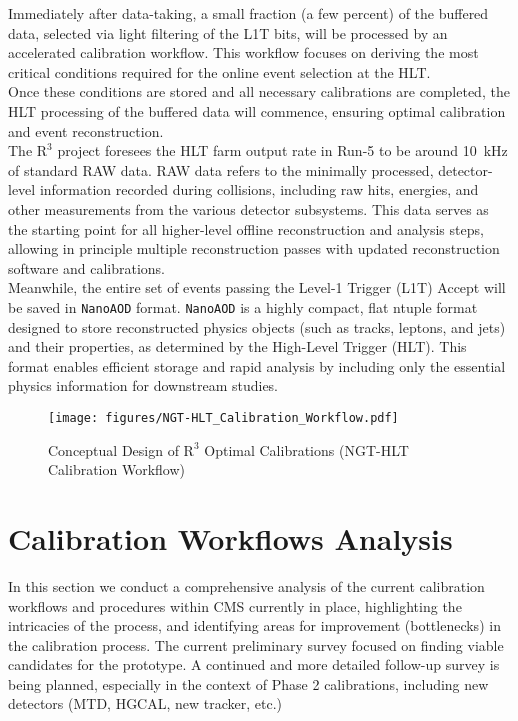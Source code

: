 Immediately after data-taking, a small fraction (a few percent) of the buffered data, selected via light filtering of the L1T bits, will be processed by an accelerated calibration workflow. This workflow focuses on deriving the most critical conditions required for the online event selection at the HLT.\\
Once these conditions are stored and all necessary calibrations are completed, the HLT processing of the buffered data will commence, ensuring optimal calibration and event reconstruction. \\
The $\mathrm{R}^3$ project foresees the HLT farm output rate in Run-\num{5} to be around \SI{10}{\kilo\hertz} of standard RAW data. RAW data refers to the minimally processed, detector-level information recorded during collisions, including raw hits, energies, and other measurements from the various detector subsystems. This data serves as the starting point for all higher-level offline reconstruction and analysis steps, allowing in principle multiple reconstruction passes with updated reconstruction software and calibrations.\\ Meanwhile, the entire set of events passing the Level-1 Trigger (L1T) Accept will be saved in \texttt{NanoAOD} format. \texttt{NanoAOD} is a highly compact, flat ntuple format designed to store reconstructed physics objects (such as tracks, leptons, and jets) and their properties, as determined by the High-Level Trigger (HLT). This format enables efficient storage and rapid analysis by including only the essential physics information for downstream studies.


\begin{figure}[h!]	
\centering
\texttt{[image: figures/NGT-HLT\_Calibration\_Workflow.pdf]} %
\caption{Conceptual Design of $\mathrm{R}^{3}$ Optimal Calibrations (NGT-HLT Calibration Workflow)}
\label{fig:NGT-HLT_CalibrationWorkflow}
\end{figure}

\section{Calibration Workflows Analysis}
In this section we conduct a comprehensive analysis of the current calibration workflows and procedures within CMS currently in place, highlighting the intricacies of the process, and identifying areas for improvement (bottlenecks) in the calibration process. 
The current preliminary survey focused on finding viable candidates for the prototype. A continued and more detailed follow-up survey is being planned, especially in the context of Phase 2 calibrations, including new detectors (MTD, HGCAL, new tracker, etc.)

